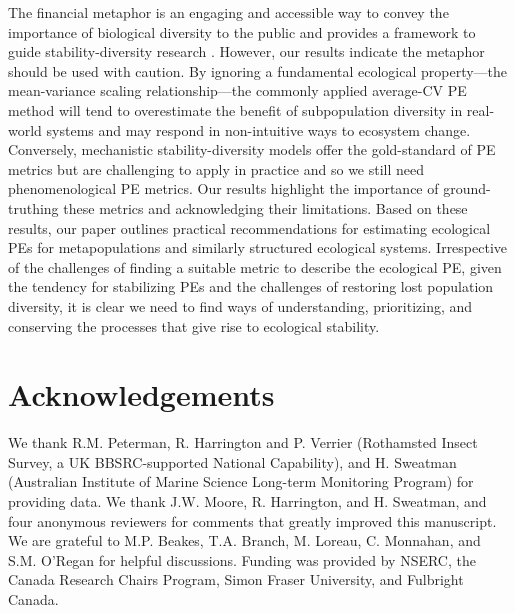 The financial metaphor is an engaging and accessible way to convey the
importance of biological diversity to the public and provides a framework to guide
stability-diversity research \citep{figge2004, koellner2006}. However,
our results indicate the metaphor should be used with caution. By ignoring a
fundamental ecological property---the mean-variance scaling relationship---the
commonly applied average-CV PE method will tend to overestimate the benefit
of subpopulation diversity in real-world systems and may respond in
non-intuitive ways to ecosystem change.
Conversely, mechanistic stability-diversity models offer the gold-standard of PE
metrics but are challenging to apply in practice and so we still need phenomenological PE
metrics. Our results highlight the importance of
ground-truthing these metrics
and acknowledging their limitations.
Based on these results, our paper outlines practical recommendations
for estimating ecological PEs for metapopulations and similarly structured
ecological systems.
Irrespective of the challenges of finding a suitable metric to describe
the ecological PE,
given the tendency for stabilizing PEs and the challenges of
restoring lost population diversity,
it is clear we need to
find ways of understanding, prioritizing, and conserving the processes that
give rise to ecological stability.

\section{Acknowledgements}

We thank R.M. Peterman, R. Harrington and P. Verrier (Rothamsted Insect Survey,
a UK BBSRC-supported National Capability), and H. Sweatman (Australian Institute
of Marine Science Long-term Monitoring Program) for providing data. We thank
J.W. Moore, R. Harrington, and H. Sweatman, and four anonymous reviewers for
comments that greatly improved this manuscript. We are grateful to M.P. Beakes,
T.A. Branch, M. Loreau, C. Monnahan, and S.M. O'Regan for helpful discussions.
Funding was provided by NSERC, the Canada Research Chairs Program, Simon Fraser
University, and Fulbright Canada.

% 
% 


%
\clearpage


%
%    
